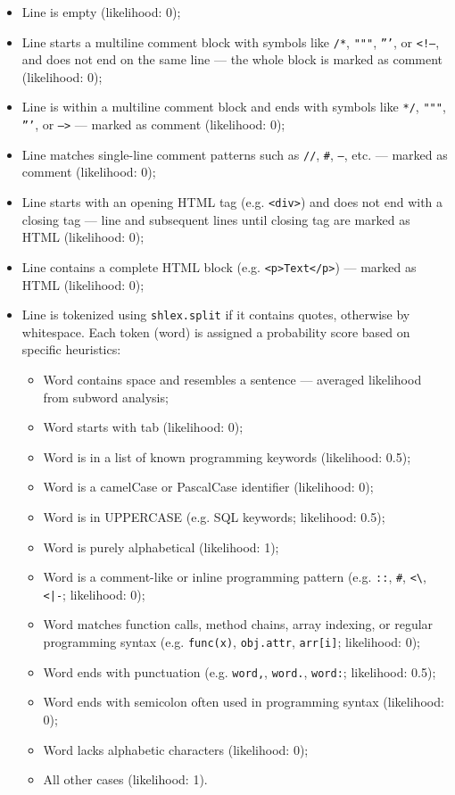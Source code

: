 \begin{itemize}
    \item Line is empty (likelihood: 0);
    \item Line starts a multiline comment block with symbols like \texttt{/*}, \texttt{"""}, \texttt{'''}, or \texttt{<!--}, and does not end on the same line --- the whole block is marked as comment (likelihood: 0);
    \item Line is within a multiline comment block and ends with symbols like \texttt{*/}, \texttt{"""}, \texttt{'''}, or \texttt{-->} --- marked as comment (likelihood: 0);
    \item Line matches single-line comment patterns such as \texttt{//}, \texttt{\#}, \texttt{--}, etc. --- marked as comment (likelihood: 0);
    \item Line starts with an opening HTML tag (e.g. \texttt{<div>}) and does not end with a closing tag --- line and subsequent lines until closing tag are marked as HTML (likelihood: 0);
    \item Line contains a complete HTML block (e.g. \texttt{<p>Text</p>}) --- marked as HTML (likelihood: 0);
    \item Line is tokenized using \texttt{shlex.split} if it contains quotes, otherwise by whitespace. Each token (word) is assigned a probability score based on specific heuristics:
    \begin{itemize}
        \item Word contains space and resembles a sentence --- averaged likelihood from subword analysis;
        \item Word starts with tab (likelihood: 0);
        \item Word is in a list of known programming keywords (likelihood: 0.5);
        \item Word is a camelCase or PascalCase identifier (likelihood: 0);
        \item Word is in UPPERCASE (e.g. SQL keywords; likelihood: 0.5);
        \item Word is purely alphabetical (likelihood: 1);
        \item Word is a comment-like or inline programming pattern (e.g. \texttt{::}, \texttt{\#}, \texttt{<\textbackslash }, \texttt{<|-};  likelihood: 0);
        \item Word matches function calls, method chains, array indexing, or regular programming syntax (e.g. \texttt{func(x)}, \texttt{obj.attr}, \texttt{arr[i]}; likelihood: 0);
        \item Word ends with punctuation (e.g. \texttt{word,}, \texttt{word.}, \texttt{word:}; likelihood: 0.5);
        \item Word ends with semicolon often used in programming syntax (likelihood: 0);
        \item Word lacks alphabetic characters (likelihood: 0);
        \item All other cases (likelihood: 1).
    \end{itemize}
\end{itemize}

